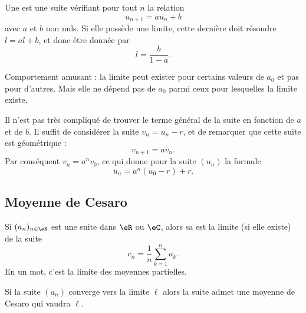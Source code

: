 \begin{example}
    Une  est une suite vérifiant pour tout \( n\) la relation
    \begin{equation}
        u_{n+1}=au_n+b
    \end{equation}
    avec \( a\) et \( b\) non nuls. Si elle possède une limite, cette dernière doit résoudre \( l=al+b\), et donc être donnée par
    \begin{equation}
        l=\frac{ b }{ 1-a }.
    \end{equation}

    Comportement amusant : la limite peut exister pour certains valeurs de \( a_0\) et pas pour d'autres. Mais elle ne dépend pas de \( a_0\) parmi ceux pour lesquelles la limite existe.

    Il n'est pas très compliqué de trouver le terme général de la suite en fonction de \( a\) et de \( b\). Il suffit de considérer la suite \( v_n=u_n-r\), et de remarquer que cette suite est géométrique :
    \begin{equation}
        v_{n+1}=av_n.
    \end{equation}
    Par conséquent \( v_n=a^nv_0\), ce qui donne pour la suite \( (u_n)\) la formule
    \begin{equation}
        u_n=a^n(u_0-r)+r.
    \end{equation}
\end{example}

\subsection{Moyenne de Cesaro}

Si \( (a_n)_{n\in \eN} \) est une suite dans \( \eR\) ou \( \eC\), alors sa  est la limite (si elle existe) de la suite
\begin{equation}
    c_n=\frac{1}{ n }\sum_{k=1}^na_k.
\end{equation}
En un mot, c'est la limite des moyennes partielles.

\begin{lemma}       \label{LemyGjMqM}
    Si la suite \( (a_n)\) converge vers la limite \( \ell\) alors la suite admet une moyenne de Cesaro qui vaudra \( \ell\).
\end{lemma}


